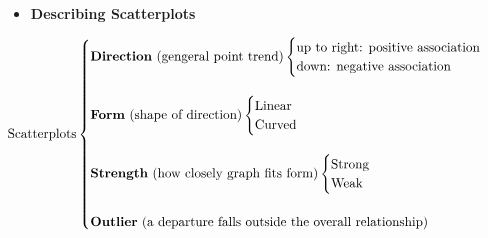 \documentclass[Main.tex]{subfiles}
\begin{document}
	\begin{example} \hfill \\
		\begin{itemize}	
			\item \textbf{Describing Scatterplots}
		\end{itemize}		
				 \begin{subequations}
				 	\begin{align}
				 	\text{Scatterplots}				 	
				 	\begin{cases}
				 	\text{\textbf{Direction} (gengeral point trend)}
					 	\begin{cases}
					 	\text{up to right: positive association}\\
					 	\text{down: negative association}
					 	\end{cases}	\hfill \\ \\				 	
				 	\text{\textbf{Form} (shape of direction)}				 	
					 	\begin{cases}
					 	\text{Linear}\\
					 	\text{Curved}
					 	\end{cases}	\hfill \\ \\						 		
				 	\text{\textbf{Strength} (how closely graph fits form)}				 	
					 	\begin{cases}
					 	\text{Strong}\\
					 	\text{Weak}\\
					 	\end{cases}\hfill \\ \\					
					\text{\textbf{Outlier} (a departure falls outside the overall relationship)}						 					 			 	
				 	\end{cases}
				 	\end{align}
				 \end{subequations}					
	\end{example} \hfill \newpage
	
\end{document}
